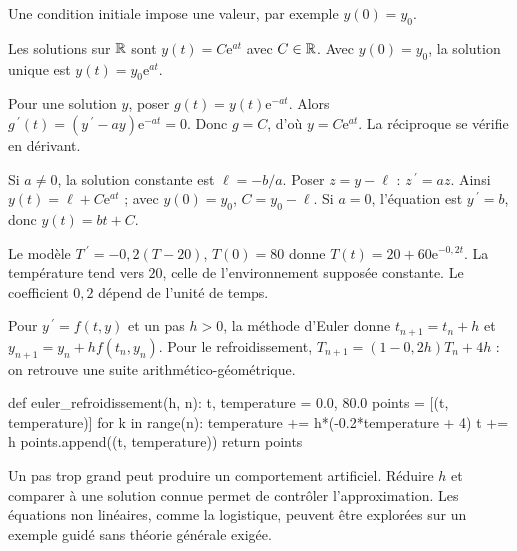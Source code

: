 Une condition initiale impose une valeur, par exemple $y(0)=y_0$.
\begin{theoreme}[$y\,\!^{\prime}=ay$]
Les solutions sur $\mathbb{R}$ sont $y(t)=C\mathrm e^{at}$ avec $C\in\mathbb{R}$. Avec $y(0)=y_0$, la solution unique est $y(t)=y_0\mathrm e^{at}$.
\end{theoreme}
\begin{demonstration}
Pour une solution $y$, poser $g(t)=y(t)\mathrm e^{-at}$. Alors $g\,\!^{\prime}(t)=(y\,\!^{\prime}-ay)\mathrm e^{-at}=0$.
Donc $g=C$, d'où $y=C\mathrm e^{at}$. La réciproque se vérifie en dérivant.
\end{demonstration}
\begin{savoirfaire}[$y\,\!^{\prime}=ay+b$]
Si $a\ne0$, la solution constante est $\ell=-b/a$. Poser $z=y-\ell$ : $z\,\!^{\prime}=az$.
Ainsi $y(t)=\ell+C\mathrm e^{at}$ ; avec $y(0)=y_0$, $C=y_0-\ell$.
Si $a=0$, l'équation est $y\,\!^{\prime}=b$, donc $y(t)=bt+C$.
\end{savoirfaire}
\begin{exemple}[Refroidissement]
Le modèle $T\,\!^{\prime}=-0{,}2(T-20)$, $T(0)=80$ donne $T(t)=20+60\mathrm e^{-0{,}2t}$.
La température tend vers $20$, celle de l'environnement supposée constante. Le coefficient $0{,}2$ dépend de l'unité de temps.
\end{exemple}
Pour $y\,\!^{\prime}=f(t,y)$ et un pas $h>0$, la méthode d'Euler donne
$t_{n+1}=t_n+h$ et $y_{n+1}=y_n+h f(t_n,y_n)$.
Pour le refroidissement, $T_{n+1}=(1-0{,}2h)T_n+4h$ : on retrouve une suite arithmético-géométrique.
\begin{python}
def euler_refroidissement(h, n):
    t, temperature = 0.0, 80.0
    points = [(t, temperature)]
    for k in range(n):
        temperature += h*(-0.2*temperature + 4)
        t += h
        points.append((t, temperature))
    return points
\end{python}
Un pas trop grand peut produire un comportement artificiel. Réduire $h$ et comparer à une solution connue permet de contrôler l'approximation. Les équations non linéaires, comme la logistique, peuvent être explorées sur un exemple guidé sans théorie générale exigée.

